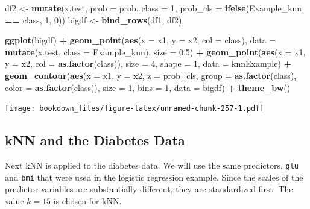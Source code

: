 \documentclass[
]{krantz}
\makeatletter
\newenvironment{Shaded}{\begin{snugshade}}{\end{snugshade}}
\newcommand{\DataTypeTok}[1]{\textcolor[rgb]{0.27,0.27,0.27}{#1}}
\newcommand{\DecValTok}[1]{\textcolor[rgb]{0.06,0.06,0.06}{#1}}
\newcommand{\FloatTok}[1]{\textcolor[rgb]{0.06,0.06,0.06}{#1}}
\newcommand{\KeywordTok}[1]{\textcolor[rgb]{0.27,0.27,0.27}{\textbf{#1}}}
\newcommand{\NormalTok}[1]{#1}
\newcommand{\OperatorTok}[1]{\textcolor[rgb]{0.43,0.43,0.43}{\textbf{#1}}}
\newcommand{\StringTok}[1]{\textcolor[rgb]{0.5,0.5,0.5}{#1}}
\newenvironment{kframe}{%
\medskip{}
\setlength{\fboxsep}{.8em}
 \def\at@end@of@kframe{}%
 \ifinner\ifhmode%
  \def\at@end@of@kframe{\end{minipage}}%
  \begin{minipage}{\columnwidth}%
 \fi\fi%
 \def\FrameCommand##1{\hskip\@totalleftmargin \hskip-\fboxsep
 \colorbox{shadecolor}{##1}\hskip-\fboxsep
     \hskip-\linewidth \hskip-\@totalleftmargin \hskip\columnwidth}%
 \MakeFramed {\advance\hsize-\width
   \@totalleftmargin\z@ \linewidth\hsize
   \@setminipage}}%
 {\par\unskip\endMakeFramed%
 \at@end@of@kframe}
\renewenvironment{Shaded}{\begin{kframe}}{\end{kframe}}
\makeatother
\begin{document}
\begin{Shaded}
\begin{Highlighting}[]
\NormalTok{df2 \textless{}{-}}\StringTok{ }\KeywordTok{mutate}\NormalTok{(x.test, }\DataTypeTok{prob =}\NormalTok{ prob, }\DataTypeTok{class =} \DecValTok{1}\NormalTok{,  }\DataTypeTok{prob\_cls =} \KeywordTok{ifelse}\NormalTok{(Example\_knn }\OperatorTok{==}\StringTok{ }\NormalTok{class, }\DecValTok{1}\NormalTok{, }\DecValTok{0}\NormalTok{))}
\NormalTok{bigdf \textless{}{-}}\StringTok{ }\KeywordTok{bind\_rows}\NormalTok{(df1, df2)}

\KeywordTok{ggplot}\NormalTok{(bigdf) }\OperatorTok{+}\StringTok{ }\KeywordTok{geom\_point}\NormalTok{(}\KeywordTok{aes}\NormalTok{(}\DataTypeTok{x =}\NormalTok{ x1, }\DataTypeTok{y =}\NormalTok{ x2, }\DataTypeTok{col =}\NormalTok{ class), }\DataTypeTok{data =} \KeywordTok{mutate}\NormalTok{(x.test, }\DataTypeTok{class =}\NormalTok{ Example\_knn), }\DataTypeTok{size =} \FloatTok{0.5}\NormalTok{) }\OperatorTok{+}\StringTok{ }\KeywordTok{geom\_point}\NormalTok{(}\KeywordTok{aes}\NormalTok{(}\DataTypeTok{x =}\NormalTok{ x1, }\DataTypeTok{y =}\NormalTok{ x2, }\DataTypeTok{col =} \KeywordTok{as.factor}\NormalTok{(class)), }\DataTypeTok{size =} \DecValTok{4}\NormalTok{, }\DataTypeTok{shape =} \DecValTok{1}\NormalTok{, }\DataTypeTok{data =}\NormalTok{ knnExample) }\OperatorTok{+}\StringTok{ }\KeywordTok{geom\_contour}\NormalTok{(}\KeywordTok{aes}\NormalTok{(}\DataTypeTok{x =}\NormalTok{ x1, }\DataTypeTok{y =}\NormalTok{ x2, }\DataTypeTok{z =}\NormalTok{ prob\_cls, }\DataTypeTok{group =} \KeywordTok{as.factor}\NormalTok{(class), }\DataTypeTok{color =} \KeywordTok{as.factor}\NormalTok{(class)), }\DataTypeTok{size =} \DecValTok{1}\NormalTok{, }\DataTypeTok{bins =} \DecValTok{1}\NormalTok{, }\DataTypeTok{data =}\NormalTok{ bigdf) }\OperatorTok{+}\StringTok{ }\KeywordTok{theme\_bw}\NormalTok{()}
\end{Highlighting}
\end{Shaded}

\texttt{[image: bookdown\_files/figure-latex/unnamed-chunk-257-1.pdf]}

\hypertarget{knn-and-the-diabetes-data}{%
\subsection{kNN and the Diabetes Data}\label{knn-and-the-diabetes-data}}

Next kNN is applied to the diabetes data. We will use the same predictors, \texttt{glu} and \texttt{bmi} that were used in the logistic regression example. Since the scales of the predictor variables are substantially different, they are standardized first. The value \(k=15\) is chosen for kNN.
\end{document}
